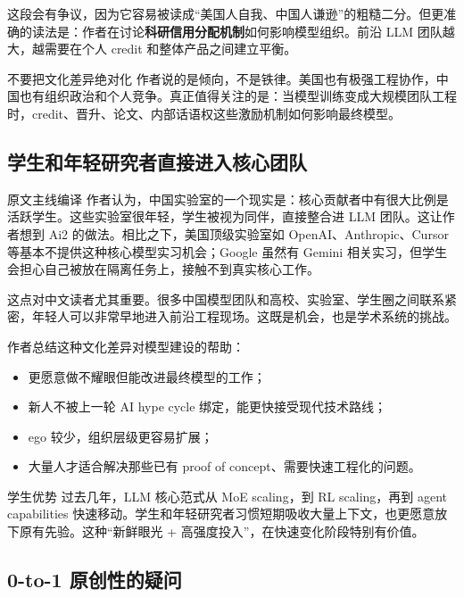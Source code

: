 \documentclass[a4paper]{article}
\begin{document}
这段会有争议，因为它容易被读成``美国人自我、中国人谦逊''的粗糙二分。但更准确的读法是：作者在讨论\textbf{科研信用分配机制}如何影响模型组织。前沿 LLM 团队越大，越需要在个人 credit 和整体产品之间建立平衡。

\begin{warningbox}{不要把文化差异绝对化}
作者说的是倾向，不是铁律。美国也有极强工程协作，中国也有组织政治和个人竞争。真正值得关注的是：当模型训练变成大规模团队工程时，credit、晋升、论文、内部话语权这些激励机制如何影响最终模型。
\end{warningbox}

\subsection{学生和年轻研究者直接进入核心团队}

\begin{translationbox}{原文主线编译}
作者认为，中国实验室的一个现实是：核心贡献者中有很大比例是活跃学生。这些实验室很年轻，学生被视为同伴，直接整合进 LLM 团队。这让作者想到 Ai2 的做法。相比之下，美国顶级实验室如 OpenAI、Anthropic、Cursor 等基本不提供这种核心模型实习机会；Google 虽然有 Gemini 相关实习，但学生会担心自己被放在隔离任务上，接触不到真实核心工作。
\end{translationbox}

这点对中文读者尤其重要。很多中国模型团队和高校、实验室、学生圈之间联系紧密，年轻人可以非常早地进入前沿工程现场。这既是机会，也是学术系统的挑战。

作者总结这种文化差异对模型建设的帮助：

\begin{itemize}[leftmargin=1.5em]
    \item 更愿意做不耀眼但能改进最终模型的工作；
    \item 新人不被上一轮 AI hype cycle 绑定，能更快接受现代技术路线；
    \item ego 较少，组织层级更容易扩展；
    \item 大量人才适合解决那些已有 proof of concept、需要快速工程化的问题。
\end{itemize}

\begin{importantbox}{学生优势}
过去几年，LLM 核心范式从 MoE scaling，到 RL scaling，再到 agent capabilities 快速移动。学生和年轻研究者习惯短期吸收大量上下文，也更愿意放下原有先验。这种``新鲜眼光 + 高强度投入''，在快速变化阶段特别有价值。
\end{importantbox}

\subsection{0-to-1 原创性的疑问}
\end{document}
